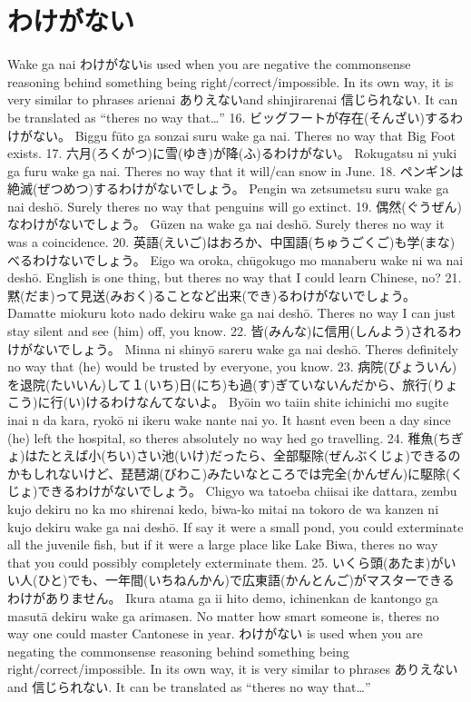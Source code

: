 \section{わけがない}
 Wake ga nai わけがないis used when you are negative the commonsense reasoning behind something being right\slash correct\slash impossible. In its own way, it is very similar to phrases arienai ありえないand shinjirarenai 信じられない. It can be translated as “there\textquotesingle s no way that…” 16. ビッグフートが存在(そんざい)するわけがない。 Biggu fūto ga sonzai suru wake ga nai. There\textquotesingle s no way that Big Foot exists. 17. 六月(ろくがつ)に雪(ゆき)が降(ふ)るわけがない。 Rokugatsu ni yuki ga furu wake ga nai. There\textquotesingle s no way that it will\slash can snow in June. 18. ペンギンは絶滅(ぜつめつ)するわけがないでしょう。 Pengin wa zetsumetsu suru wake ga nai deshō. Surely there\textquotesingle s no way that penguins will go extinct. 19. 偶然(ぐうぜん)なわけがないでしょう。 Gūzen na wake ga nai deshō. Surely there\textquotesingle s no way it was a coincidence. 20. 英語(えいご)はおろか、中国語(ちゅうごくご)も学(まな)べるわけないでしょう。 Eigo wa oroka, chūgokugo mo manaberu wake ni wa nai deshō. English is one thing, but there\textquotesingle s no way that I could learn Chinese, no? 21. 黙(だま)って見送(みおく)ることなど出来(でき)るわけがないでしょう。 Damatte miokuru koto nado dekiru wake ga nai deshō. There\textquotesingle s no way I can just stay silent and see (him) off, you know. 22. 皆(みんな)に信用(しんよう)されるわけがないでしょう。 Min\textquotesingle na ni shin\textquotesingle yō sareru wake ga nai deshō. There\textquotesingle s definitely no way that (he) would be trusted by everyone, you know. 23. 病院(びょういん)を退院(たいいん)して１(いち)日(にち)も過(す)ぎていないんだから、旅行(りょこう)に行(い)けるわけなんてないよ。 Byōin wo tai\textquotesingle in shite ichinichi mo sugite inai n da kara, ryokō ni ikeru wake nante nai yo. It hasn\textquotesingle t even been a day since (he) left the hospital, so there\textquotesingle s absolutely no way he\textquotesingle d go travelling. 24. 稚魚(ちぎょ)はたとえば小(ちい)さい池(いけ)だったら、全部駆除(ぜんぶくじょ)できるのかもしれないけど、琵琶湖(びわこ)みたいなところでは完全(かんぜん)に駆除(くじょ)できるわけがないでしょう。 Chigyo wa tatoeba chiisai ike dattara, zembu kujo dekiru no ka mo shirenai kedo, biwa-ko mitai na tokoro de wa kanzen ni kujo dekiru wake ga nai deshō. If say it were a small pond, you could exterminate all the juvenile fish, but if it were a large place like Lake Biwa, there\textquotesingle s no way that you could possibly completely exterminate them. 25. いくら頭(あたま)がいい人(ひと)でも、一年間(いちねんかん)で広東語(かんとんご)がマスターできるわけがありません。 Ikura atama ga ii hito demo, ichinenkan de kantongo ga masutā dekiru wake ga arimasen. No matter how smart someone is, there\textquotesingle s no way one could master Cantonese in year.  \emph{ }わけがない is used when you are negating the commonsense reasoning behind something being right\slash correct\slash impossible. In its own way, it is very similar to phrases ありえない and 信じられない. It can be translated as “there\textquotesingle s no way that…”  
